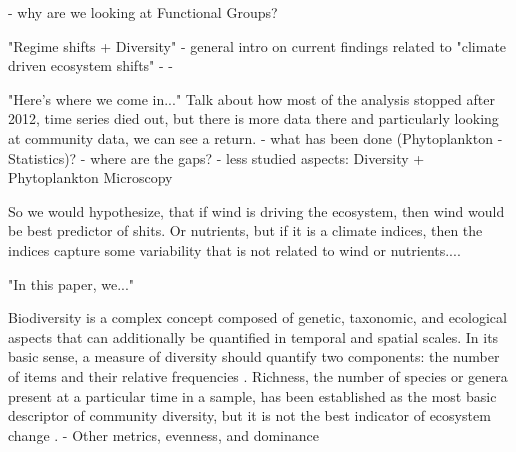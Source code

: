 \documentclass[draft]{agujournal2019}
\begin{document}
    - why are we looking at Functional Groups?
    
    "Regime shifts + Diversity" - general intro on current findings related to "climate driven ecosystem shifts"
        - %
        - 

        "Here's where we come in..." Talk about how most of the analysis stopped after 2012, time series died out, but there is more data there and particularly looking at community data, we can see a return.
    - what has been done (Phytoplankton - Statistics)?
    - where are the gaps?
    - less studied aspects: Diversity + Phytoplankton Microscopy

    So we would hypothesize, that if wind is driving the ecosystem, then wind would be best predictor of shits.
    Or nutrients, but if it is a climate indices, then the indices capture some variability that is not related to wind or nutrients....
        
    
    "In this paper, we..." 





    Biodiversity is a complex concept composed of genetic, taxonomic, and ecological aspects that can additionally be quantified in temporal and spatial scales. In its basic sense, a measure of diversity should quantify two components: the number of items and their relative frequencies \cite{borics_freshwater_2021}. 
    Richness, the number of species or genera present at a particular time in a sample, has been established as the most basic descriptor of community diversity, but it is not the best indicator of ecosystem change \cite{hillebrand_biodiversity_2018}.
    - Other metrics, evenness, and dominance
\end{document}
